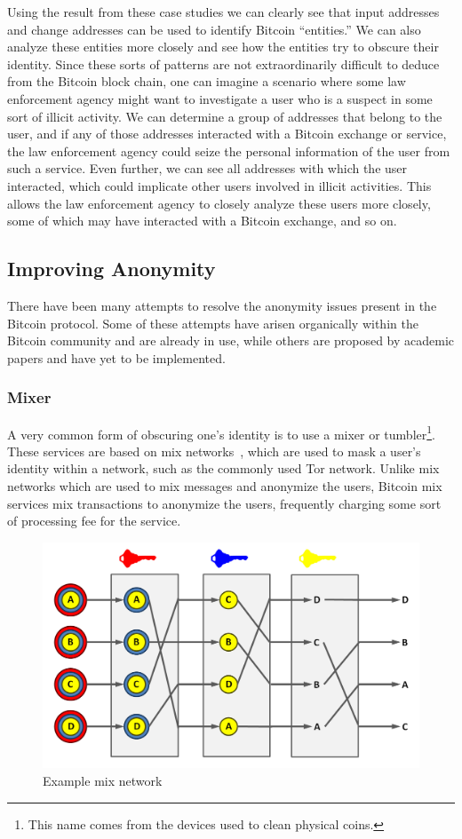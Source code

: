 \documentclass[11pt]{article}
\begin{document}
Using the result from these case studies we can clearly see that input addresses and
change addresses can be used to identify Bitcoin ``entities.'' We can also analyze
these entities more closely and see how the entities try to obscure their
identity. Since these sorts of patterns are not extraordinarily difficult to
deduce from the Bitcoin block chain, one can imagine a scenario where some law
enforcement agency might want to investigate a user who is a suspect in some
sort of illicit activity. We can determine a group of addresses that belong to
the user, and if any of those addresses interacted with a Bitcoin exchange or
service, the law enforcement agency could seize the personal
information of the user from such a service. Even further, we can see all
addresses with which the user interacted, which could implicate other users
involved in illicit activities. This allows the law enforcement agency to
closely analyze these users more closely, some of which may have interacted with
a Bitcoin exchange, and so on.

\subsection{Improving Anonymity}
There have been many attempts to resolve the anonymity issues present in the
Bitcoin protocol. Some of these attempts have arisen organically within the
Bitcoin community and are already in use, while others are proposed by academic
papers and have yet to be implemented.

\subsubsection{Mixer}
A very common form of obscuring one's identity is to use a mixer or
tumbler\footnote{This name comes from the devices used to clean physical coins.}.
These services are based on mix networks~\cite{chaum81}, which are used to mask
a user's identity within a network, such as the commonly used Tor network.
Unlike mix networks which are used to mix messages and anonymize the
users, Bitcoin mix services mix transactions to anonymize the users, frequently
charging some sort of processing fee for the service.

\begin{figure}[H]
    \caption[Example mix network]{Example mix network\protect\footnotemark}
    \centering
    \includegraphics[width=.8\linewidth]{figures/mix.png}
\end{figure}
\end{document}
